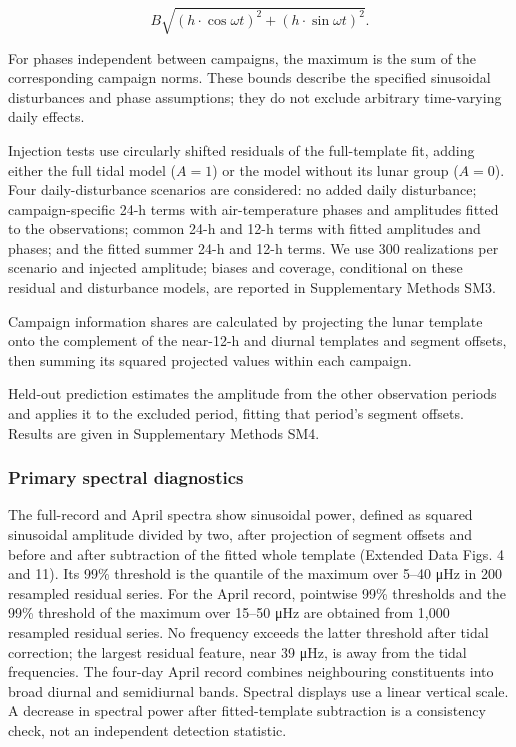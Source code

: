 \documentclass[
  11pt,
  a4paper,
]{article}
\begin{document}
\[
B\sqrt{(h\cdot\cos\omega t)^2+(h\cdot\sin\omega t)^2}.
\]

For phases independent between campaigns, the maximum is the sum of the
corresponding campaign norms. These bounds describe the specified
sinusoidal disturbances and phase assumptions; they do not exclude
arbitrary time-varying daily effects.

Injection tests use circularly shifted residuals of the full-template
fit, adding either the full tidal model (\(A=1\)) or the model without
its lunar group (\(A=0\)). Four daily-disturbance scenarios are
considered: no added daily disturbance; campaign-specific 24-h terms
with air-temperature phases and amplitudes fitted to the observations;
common 24-h and 12-h terms with fitted amplitudes and phases; and the
fitted summer 24-h and 12-h terms. We use 300 realizations per scenario
and injected amplitude; biases and coverage, conditional on these
residual and disturbance models, are reported in Supplementary Methods
SM3.

Campaign information shares are calculated by projecting the lunar
template onto the complement of the near-12-h and diurnal templates and
segment offsets, then summing its squared projected values within each
campaign.

Held-out prediction estimates the amplitude from the other observation
periods and applies it to the excluded period, fitting that period's
segment offsets. Results are given in Supplementary Methods SM4.

\hypertarget{primary-spectral-diagnostics}{%
\subsubsection{Primary spectral
diagnostics}\label{primary-spectral-diagnostics}}

The full-record and April spectra show sinusoidal power, defined as
squared sinusoidal amplitude divided by two, after projection of segment
offsets and before and after subtraction of the fitted whole template
(Extended Data Figs. 4 and 11). Its 99\% threshold is the quantile of
the maximum over 5--40 μHz in 200 resampled residual series. For the
April record, pointwise 99\% thresholds and the 99\% threshold of the
maximum over 15--50 μHz are obtained from 1,000 resampled residual
series. No frequency exceeds the latter threshold after tidal
correction; the largest residual feature, near 39 μHz, is away from the
tidal frequencies. The four-day April record combines neighbouring
constituents into broad diurnal and semidiurnal bands. Spectral displays
use a linear vertical scale. A decrease in spectral power after
fitted-template subtraction is a consistency check, not an independent
detection statistic.
\end{document}
